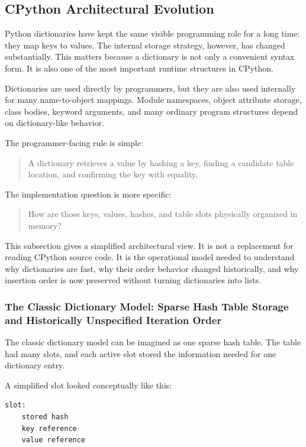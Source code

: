 \subsection{CPython Architectural Evolution}

Python dictionaries have kept the same visible programming role for a long time: they map keys to values. The internal storage strategy, however, has changed substantially. This matters because a dictionary is not only a convenient syntax form. It is also one of the most important runtime structures in CPython.

Dictionaries are used directly by programmers, but they are also used internally for many name-to-object mappings. Module namespaces, object attribute storage, class bodies, keyword arguments, and many ordinary program structures depend on dictionary-like behavior.

The programmer-facing rule is simple:

\begin{quote}
A dictionary retrieves a value by hashing a key, finding a candidate table location, and confirming the key with equality.
\end{quote}

The implementation question is more specific:

\begin{quote}
How are those keys, values, hashes, and table slots physically organized in memory?
\end{quote}

This subsection gives a simplified architectural view. It is not a replacement for reading CPython source code. It is the operational model needed to understand why dictionaries are fast, why their order behavior changed historically, and why insertion order is now preserved without turning dictionaries into lists.

\subsubsection{The Classic Dictionary Model: Sparse Hash Table Storage and Historically Unspecified Iteration Order}

The classic dictionary model can be imagined as one sparse hash table. The table had many slots, and each active slot stored the information needed for one dictionary entry.

A simplified slot looked conceptually like this:

\begin{verbatim}
slot:
    stored hash
    key reference
    value reference
\end{verbatim}

